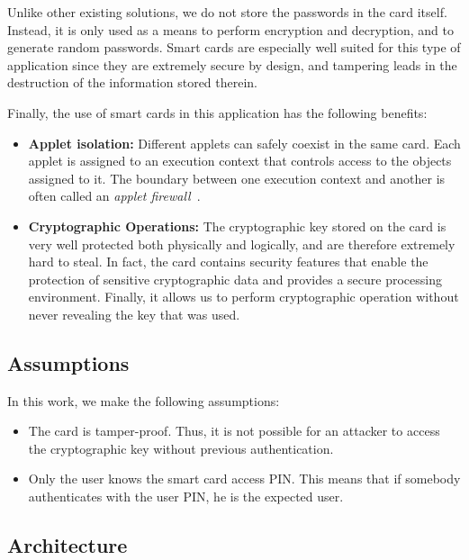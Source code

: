 \documentclass[a4paper, 11pt]{article}
\begin{document}
    Unlike other existing solutions, we do not store the passwords in the card itself.
    Instead, it is only used as a means to perform encryption and decryption, and to generate random passwords.
    Smart cards are especially well suited for this type of application since they are extremely secure by design, and
    tampering leads in the destruction of the information stored therein.

    Finally, the use of smart cards in this application has the following benefits:

    \begin{itemize}
        \item \textbf{Applet isolation:} Different applets can safely coexist in the same card.
        Each applet is assigned to an execution context that controls access to the objects assigned to it.
        The boundary between one execution context and another is often called an \textit{applet
        firewall}~\cite{AnIntrod42:online}.
        \item \textbf{Cryptographic Operations:} The cryptographic key stored on the card is very well protected both
        physically and logically, and are therefore extremely hard to steal.
        In fact, the card contains security features that enable the protection of sensitive cryptographic data and
        provides a secure processing environment.
        Finally, it allows us to perform cryptographic operation without never revealing the key that was used.

    \end{itemize}

    \subsection{Assumptions}\label{subsec:assumptions}

    In this work, we make the following assumptions:

    \begin{itemize}
        \item The card is tamper-proof.
        Thus, it is not possible for an attacker to access the cryptographic key without previous authentication.
        \item Only the user knows the smart card access PIN. This means that if somebody authenticates
        with the user PIN, he is the expected user.
    \end{itemize}

    \subsection{Architecture}\label{subsec:architecture}
\end{document}
